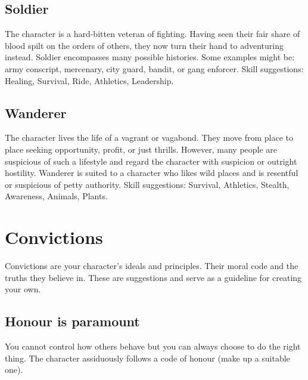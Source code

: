 \documentclass[a4paper,10pt,oneside]{book}
\begin{document}
\subsection{Soldier}
The character is a hard-bitten veteran of fighting. Having seen their fair share of blood spilt on the orders of others, they now turn their hand to adventuring instead. Soldier encompasses many possible histories. Some examples might be: army conscript, mercenary, city guard, bandit, or gang enforcer. Skill suggestions: Healing, Survival, Ride, Athletics, Leadership. 

\subsection{Wanderer}
The character lives the life of a vagrant or vagabond. They move from place to place seeking opportunity, profit, or just thrills. However, many people are suspicious of such a lifestyle and regard the character with suspicion or outright hostility. Wanderer is suited to a character who likes wild places and is resentful or suspicious of petty authority. Skill suggestions: Survival, Athletics, Stealth, Awareness, Animals, Plants.






\section{Convictions}
\label{sec:convictions}
Convictions are your character's ideals and principles. Their moral code and the truths they believe in. These are suggestions and serve as a guideline for creating your own.

\subsection{Honour is paramount}
You cannot control how others behave but you can always choose to do the right thing. The character assiduously follows a code of honour (make up a suitable one).
\end{document}
